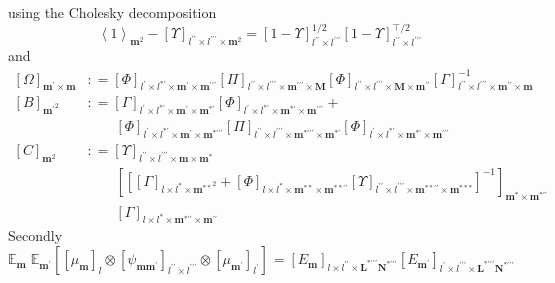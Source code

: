 \documentclass[preprint,12pt]{elsarticle}
\newcommand*{\M}[1]{\ensuremath{#1}\xspace}
\newcommand*{\x}{\times}
\newcommand*{\mi}[1]{\mathbf{#1}}
\newcommand*{\te}[2][]{\left\lbrack{#2}\right\rbrack_{#1}}
\newcommand*{\diag}[2][]{\left\langle{#2}\right\rangle_{#1}}
\newcommand*{\deq}{\M{\mathrel{\mathop:}=}}
\newcommand*{\evt}[3][]{\mathbb{E}_{#3}^{#1}\!#2}
\begin{document}
        using the Cholesky decomposition
        \begin{equation*}
            \diag[\mi{m}^{2}]{1} - \te[l^{\prime\prime}\x l^{\prime\prime\prime}\x\mi{m}^{2}]{\Upsilon}
            = \te[l^{\prime\prime}\x l^{\prime\prime\prime}]{1-\Upsilon}^{1/2} \te[l^{\prime\prime}\x l^{\prime\prime\prime}]{1-\Upsilon}^{\intercal/2}
        \end{equation*}
        and
        \begin{equation*}
            \begin{aligned}
                \te[\mi{m^{\prime}\x m}]{\Omega} &\deq 
                \te[l^{\prime}\x l^{*\prime}\x\mi{m^{\prime}}\x\mi{m^{\prime\prime\prime}}]{\Phi}
                \te[l^{\prime\prime}\x l^{\prime\prime\prime}\x\mi{m^{\prime\prime\prime}}\x\mi{M}]{\Pi}
                \te[l^{\prime\prime}\x l^{\prime\prime\prime}\x\mi{M}\x\mi{m^{\prime\prime}}]{\Phi}
                \te[l^{\prime\prime}\x l^{\prime\prime\prime}\x\mi{m^{\prime\prime}}\x\mi{m}]{\Gamma}^{-1} \\
                \te[\mi{m^{\prime}}^{2}]{B} &\deq 
                \te[l^{\prime}\x l^{*\prime}\x\mi{m^{\prime}}\x\mi{m^{*\prime}}]{\Gamma}
                \te[l^{\prime}\x l^{*\prime}\x\mi{m^{*\prime}}\x\mi{m^{\prime\prime\prime}}]{\Phi} + \\
                &\phantom{\deq\ }\te[l^{\prime}\x l^{*\prime}\x\mi{m^{\prime}}\x\mi{m^{*\prime\prime\prime}}]{\Phi}
                \te[l^{\prime\prime}\x l^{\prime\prime\prime}\x\mi{m^{*\prime\prime\prime}}\x\mi{m^{*\prime}}]{\Pi}
                \te[l^{\prime}\x l^{*\prime}\x\mi{m^{*\prime}}\x\mi{m^{\prime\prime\prime}}]{\Phi} \\
                \te[\mi{m}^{2}]{C} &\deq 
                \te[l^{\prime\prime}\x l^{\prime\prime\prime}\x\mi{m}\x\mi{m^{*}}]{\Upsilon} \\
                &\phantom{\deq\ }
                \te[\mi{m^{*}}\x\mi{m^{*\prime\prime}}]{\te[]{\te[l\x l^{*}\x\mi{m^{**}}^{2}]{\Gamma}
                + \te[l\x l^{*}\x\mi{m^{**}}\x\mi{m^{**\prime\prime}}]{\Phi}\te[l^{\prime\prime}\x l^{\prime\prime\prime}\x\mi{m^{**\prime\prime}}\x\mi{m^{***}}]{\Upsilon}}^{-1}} \\
                &\phantom{\deq\ }\te[l\x l^{*}\x\mi{m^{*\prime\prime}}\x\mi{m^{\prime\prime}}]{\Gamma}
            \end{aligned}
        \end{equation*}
        Secondly
        \begin{equation*}
            \evt{\;\evt{\te[]{\te[l]{\mu_{\mi{m}}} \otimes \te[l^{\prime\prime}\x l^{\prime\prime\prime}]{\psi_{\mi{mm^{\prime}}}} \otimes \te[l^{\prime}]{\mu_{\mi{m^{\prime}}}}}}{\mi{m^{\prime}}}}{\mi{m}} = 
            \te[l\x l^{\prime\prime}\x \mi{L^{*\prime\prime\prime}N^{*\prime\prime\prime}}]{E_{\mi{m}}}
            \te[l^{\prime}\x l^{\prime\prime\prime}\x \mi{L^{*\prime\prime\prime}N^{*\prime\prime\prime}}]{E_{\mi{m^{\prime}}}}
        \end{equation*}
\end{document}
